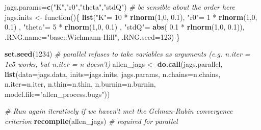 \documentclass[author-year, review]{elsarticle} %
\newenvironment{Shaded}{}{}
\newcommand{\KeywordTok}[1]{\textcolor[rgb]{0.00,0.44,0.13}{\textbf{{#1}}}}
\newcommand{\DataTypeTok}[1]{\textcolor[rgb]{0.56,0.13,0.00}{{#1}}}
\newcommand{\DecValTok}[1]{\textcolor[rgb]{0.25,0.63,0.44}{{#1}}}
\newcommand{\FloatTok}[1]{\textcolor[rgb]{0.25,0.63,0.44}{{#1}}}
\newcommand{\StringTok}[1]{\textcolor[rgb]{0.25,0.44,0.63}{{#1}}}
\newcommand{\CommentTok}[1]{\textcolor[rgb]{0.38,0.63,0.69}{\textit{{#1}}}}
\newcommand{\NormalTok}[1]{{#1}}
\begin{document}
\begin{Shaded}
\begin{Highlighting}[]
\NormalTok{jags.params=}\KeywordTok{c}\NormalTok{(}\StringTok{"K"}\NormalTok{,}\StringTok{"r0"}\NormalTok{,}\StringTok{"theta"}\NormalTok{,}\StringTok{"stdQ"}\NormalTok{) }\CommentTok{# be sensible about the order here}
\NormalTok{jags.inits <- function()\{}
  \KeywordTok{list}\NormalTok{(}\StringTok{"K"}\NormalTok{= }\DecValTok{10} \NormalTok{* }\KeywordTok{rlnorm}\NormalTok{(}\DecValTok{1}\NormalTok{,}\DecValTok{0}\NormalTok{, }\FloatTok{0.1}\NormalTok{),}
       \StringTok{"r0"}\NormalTok{= }\DecValTok{1} \NormalTok{* }\KeywordTok{rlnorm}\NormalTok{(}\DecValTok{1}\NormalTok{,}\DecValTok{0}\NormalTok{, }\FloatTok{0.1}\NormalTok{) ,}
       \StringTok{"theta"}\NormalTok{=   }\DecValTok{5} \NormalTok{* }\KeywordTok{rlnorm}\NormalTok{(}\DecValTok{1}\NormalTok{,}\DecValTok{0}\NormalTok{, }\FloatTok{0.1}\NormalTok{) , }
       \StringTok{"stdQ"}\NormalTok{= }\KeywordTok{abs}\NormalTok{( }\FloatTok{0.1} \NormalTok{* }\KeywordTok{rlnorm}\NormalTok{(}\DecValTok{1}\NormalTok{,}\DecValTok{0}\NormalTok{, }\FloatTok{0.1}\NormalTok{)),}
       \DataTypeTok{.RNG.name=}\StringTok{"base::Wichmann-Hill"}\NormalTok{, }\DataTypeTok{.RNG.seed=}\DecValTok{123}\NormalTok{)}
\NormalTok{\}}

\KeywordTok{set.seed}\NormalTok{(}\DecValTok{1234}\NormalTok{)}
\CommentTok{# parallel refuses to take variables as arguments (e.g. n.iter = 1e5 works, but n.iter = n doesn't)}
\NormalTok{allen_jags <- }\KeywordTok{do.call}\NormalTok{(jags.parallel, }\KeywordTok{list}\NormalTok{(}\DataTypeTok{data=}\NormalTok{jags.data, }\DataTypeTok{inits=}\NormalTok{jags.inits, }
                                      \NormalTok{jags.params, }\DataTypeTok{n.chains=}\NormalTok{n.chains, }
                                      \DataTypeTok{n.iter=}\NormalTok{n.iter, }\DataTypeTok{n.thin=}\NormalTok{n.thin, }
                                      \DataTypeTok{n.burnin=}\NormalTok{n.burnin, }
                                      \DataTypeTok{model.file=}\StringTok{"allen_process.bugs"}\NormalTok{))}

\CommentTok{# Run again iteratively if we haven't met the Gelman-Rubin convergence criterion}
\KeywordTok{recompile}\NormalTok{(allen_jags) }\CommentTok{# required for parallel}
\end{Highlighting}
\end{Shaded}
\end{document}
